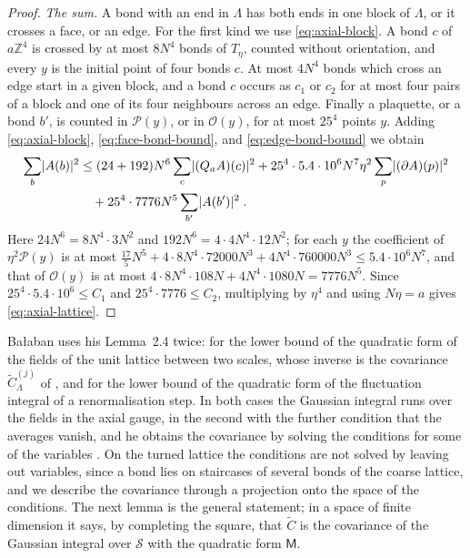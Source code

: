 \documentclass[11pt]{preprint}
\DeclarePairedDelimiter{\abs}{\lvert}{\rvert}
\numberwithin{equation}{section}
\theoremstyle{definition}
\theoremstyle{remark}
\theoremstyle{plain}
\begin{document}
\begin{proof}
\emph{The sum.} A bond with an end in $\Lambda$ has both ends in one block of $\Lambda$, or it crosses a face, or an edge. For the first kind we use \eqref{eq:axial-block}. A bond $c$ of $a\mathbb Z^4$ is crossed by at most $8N^4$ bonds of $T_\eta$, counted without orientation, and every $y$ is the initial point of four bonds $c$. At most $4N^4$ bonds which cross an edge start in a given block, and a bond $c$ occurs as $c_1$ or $c_2$ for at most four pairs of a block and one of its four neighbours across an edge. Finally a plaquette, or a bond $b'$, is counted in $\mathcal P(y)$, or in $\mathcal O(y)$, for at most $25^4$ points $y$. Adding \eqref{eq:axial-block}, \eqref{eq:face-bond-bound}, and \eqref{eq:edge-bond-bound} we obtain
\begin{equation}\label{eq:axial-lattice-sum}
\begin{split}
    \sum_b\abs{A(b)}^2 &\leq (24 + 192)N^6\sum_c\abs{(Q_aA)(c)}^2 + 25^4 \cdot 5.4 \cdot 10^6N^7\eta^2\sum_p\abs{(\partial A)(p)}^2\\
    &\quad + 25^4 \cdot 7776N^5\sum_{b'}\abs{A(b')}^2\;.
\end{split}
\end{equation}
Here $24N^6 = 8N^4 \cdot 3N^2$ and $192N^6 = 4 \cdot 4N^4 \cdot 12N^2$; for each $y$ the coefficient of $\eta^2\mathcal P(y)$ is at most $\frac{17}{5}N^5 + 4 \cdot 8N^4 \cdot 72000N^3 + 4N^4 \cdot 760000N^3 \leq 5.4 \cdot 10^6N^7$, and that of $\mathcal O(y)$ is at most $4 \cdot 8N^4 \cdot 108N + 4N^4 \cdot 1080N = 7776N^5$. Since $25^4 \cdot 5.4 \cdot 10^6 \leq C_1$ and $25^4 \cdot 7776 \leq C_2$, multiplying by $\eta^4$ and using $N\eta = a$ gives \eqref{eq:axial-lattice}.
\end{proof}

Ba{\l}aban uses his Lemma~2.4 twice: for the lower bound of the quadratic form \cite[(2.120)]{BalabanPRT2} of the fields of the unit lattice between two scales, whose inverse is the covariance $\tilde C^{(j)}_\Lambda$ of \cite[(2.129)]{BalabanPRT2}, and for the lower bound \cite[(2.153)]{BalabanPRT2} of the quadratic form of the fluctuation integral of a renormalisation step. In both cases the Gaussian integral runs over the fields in the axial gauge, in the second with the further condition that the averages vanish, and he obtains the covariance by solving the conditions for some of the variables \cite[(2.155), (2.156)]{BalabanPRT2}. On the turned lattice the conditions are not solved by leaving out variables, since a bond lies on staircases of several bonds of the coarse lattice, and we describe the covariance through a projection onto the space of the conditions. The next lemma is the general statement; in a space of finite dimension it says, by completing the square, that $\tilde C$ is the covariance of the Gaussian integral over $\mathcal S$ with the quadratic form $\mathsf M$.
\end{document}
